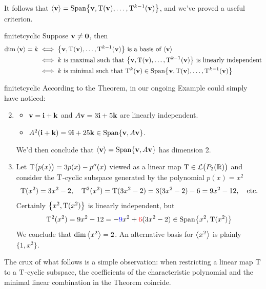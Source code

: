 It follows that $\left\langle {\mathbf{v}}\right\rangle=\operatorname{Span}\bigl\{{\mathbf{v}},\mathrm{T}({\mathbf{v}}),\ldots,\mathrm{T}^{k-1}({\mathbf{v}})\big\}$, and we've proved a useful criterion.

\begin{thm}{}{finitetcyclic}
	Suppose ${\mathbf{v}}\neq \mathbf{0}$, then
	\begin{align*}
		\dim\left\langle {\mathbf{v}}\right\rangle=k&\iff \big\{{\mathbf{v}},\mathrm{T}({\mathbf{v}}),\ldots,\mathrm{T}^{k-1}({\mathbf{v}})\big\}\text{ is a basis of $\left\langle {\mathbf{v}}\right\rangle$}\\
		&\iff k\text{ is maximal such that }\big\{{\mathbf{v}},\mathrm{T}({\mathbf{v}}),\ldots,\mathrm{T}^{k-1}({\mathbf{v}})\big\}\text{ is linearly independent}\\
		&\iff k\text{ is minimal such that }\mathrm{T}^k({\mathbf{v}})\in\operatorname{Span}\bigl\{{\mathbf{v}},\mathrm{T}({\mathbf{v}}),\ldots,\mathrm{T}^{k-1}({\mathbf{v}})\big\} 
	\end{align*}
\end{thm}


\begin{examples}{}{finitetcyclic}
	\exstart According to the Theorem, in our ongoing Example could simply have noticed:\vspace{-2pt}
	\begin{enumerate}\setcounter{enumi}{1}
	  \item[]\begin{itemize}
	  	\item ${\mathbf{v}}={\mathbf{i}}+{\mathbf{k}}$ and $A{\mathbf{v}}=3{\mathbf{i}}+5{\mathbf{k}}$ are linearly independent.
	  	\item $A^2({\mathbf{i}}+{\mathbf{k}})=9{\mathbf{i}}+25{\mathbf{k}}\in\operatorname{Span}\{{\mathbf{v}},A{\mathbf{v}}\}$.
		\end{itemize}
		We'd then conclude that $\left\langle {\mathbf{v}}\right\rangle=\operatorname{Span}\{{\mathbf{v}},A{\mathbf{v}}\}$ has dimension 2.
		
	  \item\label{ex:finitecyclic2} Let $\mathrm{T}\big(p(x)\big)=3p(x)-p''(x)$ viewed as a linear map $\mathrm{T}\in\mathcal{L}\big(P_2(\mathbb{R})\big)$ and consider the $\mathrm{T}$-cyclic subspace generated by the polynomial $p(x)=x^2$
		\[
			\mathrm{T}(x^2)=3x^2-2,\quad \mathrm{T}^2(x^2)=\mathrm{T}(3x^2-2)=3(3x^2-2)-6=9x^2-12,\quad\text{etc.}
		\]
		Certainly $\big\{x^2,\mathrm{T}(x^2)\big\}$ is linearly independent, but
		\[
			\mathrm{T}^2(x^2)=9x^2-12 
			=-\textcolor{blue}{9}x^2+\textcolor{red}{6}(3x^2-2)
			\in\operatorname{Span}\bigl\{x^2,\mathrm{T}(x^2)\big\}
		\]
		We conclude that $\dim\left\langle x^2\right\rangle=2$. An alternative basis for $\left\langle x^2\right\rangle$ is plainly $\{1,x^2\}$.
	\end{enumerate}
\end{examples}

The crux of what follows is a simple observation: when restricting a linear map $\mathrm{T}$ to a $\mathrm{T}$-cyclic subspace, the coefficients of the characteristic polynomial and the minimal linear combination in the Theorem coincide.

